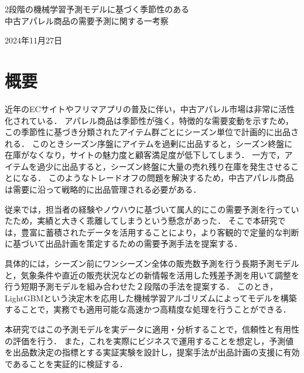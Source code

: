 \documentclass[dvipdfmx]{jreport}
\begin{document}
\begin{center}{
        \Large{2段階の機械学習予測モデルに基づく季節性のある\\中古アパレル商品の需要予測に関する一考察}
}
\end{center}

\begin{flushright}
    2024年11月27日\\
\end{flushright}


\section{概要}
近年のECサイトやフリマアプリの普及に伴い，中古アパレル市場は非常に活性化されている．
アパレル商品は季節性が強く，特徴的な需要変動を示すため，この季節性に基づき分類されたアイテム群ごとにシーズン単位で計画的に出品される．
このときシーズン序盤にアイテムを過剰に出品すると，シーズン終盤に在庫がなくなり，サイトの魅力度と顧客満足度が低下してしまう．
一方で，アイテムを過少に出品すると，シーズン終盤に大量の売れ残り在庫を発生させることになる．
このようなトレードオフの問題を解決するため，中古アパレル商品は需要に沿って戦略的に出品管理される必要がある．

従来では，担当者の経験やノウハウに基づいて属人的にこの需要予測を行っていたため，実績と大きく乖離してしまうという懸念があった．
そこで本研究では，豊富に蓄積されたデータを活用することにより，より客観的で定量的な判断に基づいて出品計画を策定するための需要予測手法を提案する．

具体的には，シーズン前にワンシーズン全体の販売数予測を行う長期予測モデルと，気象条件や直近の販売状況などの新情報を活用した残差予測を用いて調整を行う短期予測モデルを組み合わせた２段階の手法を提案する．
このとき，LightGBMという決定木を応用した機械学習アルゴリズムによってモデルを構築することで，実務でも適用可能な高速かつ高精度な処理を行うことができる．

本研究ではこの予測モデルを実データに適用・分析することで，信頼性と有用性の評価を行う．
また，これを実際にビジネスで運用することを想定し，予測値を出品数決定の指標とする実証実験を設計し，提案手法が出品計画の支援に有効であることを実証的に検証する．
\end{document}
